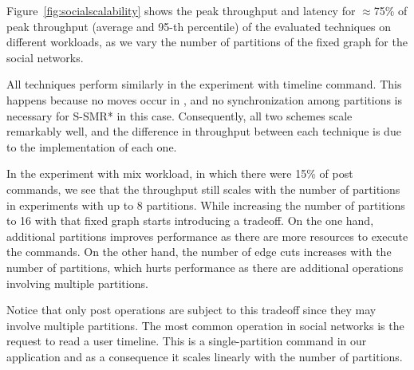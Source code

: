 Figure~\ref{fig:socialscalability} shows the peak throughput and latency for $\approx$75\% of peak throughput
 (average and 95-th percentile) of the evaluated techniques on different workloads, as we vary the number of 
 partitions of the fixed graph for the social networks.

All techniques perform similarly in the experiment with timeline command. This happens because no moves occur in
\dynastar, and no synchronization among partitions is necessary for S-SMR* in this case. 
Consequently, all two schemes scale remarkably well, and
the difference in throughput between each technique is due to the implementation of each one.



In the experiment with mix workload, in which there were 15\% of post commands, we see that the throughput still scales with the number of partitions in experiments with up to 8 partitions. While increasing the number of partitions to 16 with that fixed graph starts introducing a tradeoff. 
On the one hand, additional partitions improves performance as there are more resources to execute the commands.
On the other hand, the number of edge cuts increases with the number of partitions, which hurts performance as there are additional operations involving multiple partitions.

Notice that only post operations are subject to this tradeoff since they may involve multiple partitions.
The most common operation in social networks is the request to read a user timeline. This is a single-partition
command in our application and as a consequence it scales linearly with the number of partitions.


